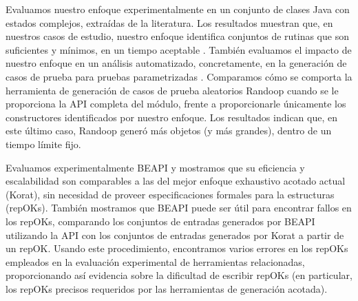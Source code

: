 Evaluamos nuestro enfoque experimentalmente en un conjunto de clases Java con estados complejos, extraídas de la literatura. Los resultados muestran que, en nuestros casos de estudio, nuestro enfoque identifica conjuntos de rutinas que son suficientes y mínimos, en un tiempo aceptable . También evaluamos el impacto de nuestro enfoque en un análisis automatizado, concretamente, en la generación de casos de prueba para pruebas parametrizadas . Comparamos cómo se comporta la herramienta de generación de casos de prueba aleatorios Randoop cuando se le proporciona la API completa del módulo, frente a proporcionarle únicamente los constructores identificados por nuestro enfoque. Los resultados indican que, en este último caso, Randoop generó más objetos (y más grandes), dentro de un tiempo límite fijo.


Evaluamos experimentalmente BEAPI y mostramos que su eficiencia y escalabilidad son comparables a las del mejor enfoque exhaustivo acotado actual (Korat), sin necesidad de proveer especificaciones formales para la estructuras (repOKs). También mostramos que BEAPI puede ser útil para encontrar fallos en los repOKs, comparando los conjuntos de entradas generados por BEAPI utilizando la API con los conjuntos de entradas generados por Korat a partir de un repOK. Usando este procedimiento, encontramos varios errores en los repOKs empleados en la evaluación experimental de herramientas relacionadas, proporcionando así evidencia sobre la dificultad de escribir repOKs (en particular, los repOKs precisos requeridos por las herramientas de generación acotada).










